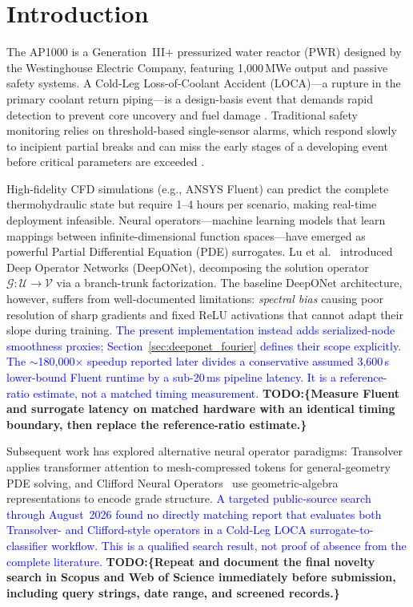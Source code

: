 \documentclass[journal]{IEEEtran}
\newcommand{\added}[1]{\textcolor{blue}{#1}}
\newcommand{\todo}[1]{\textcolor{green!50!black}{\textbf{TODO:\{#1\}}}}
\begin{document}
\section{Introduction}

The AP1000 is a Generation~III+ pressurized water reactor (PWR) designed by the Westinghouse Electric Company, featuring 1,000\,MWe output and passive safety systems. A Cold-Leg Loss-of-Coolant Accident (LOCA)---a rupture in the primary coolant return piping---is a design-basis event that demands rapid detection to prevent core uncovery and fuel damage \cite{wecdcd}. Traditional safety monitoring relies on threshold-based single-sensor alarms, which respond slowly to incipient partial breaks and can miss the early stages of a developing event before critical parameters are exceeded \cite{nrc_loca}.

High-fidelity CFD simulations (e.g., ANSYS Fluent) can predict the complete thermohydraulic state but require 1--4 hours per scenario, making real-time deployment infeasible. Neural operators---machine learning models that learn mappings between infinite-dimensional function spaces---have emerged as powerful Partial Differential Equation (PDE) surrogates. Lu et al.~\cite{lu2021deeponet} introduced Deep Operator Networks (DeepONet), decomposing the solution operator $\mathcal{G}: \mathcal{U} \to \mathcal{V}$ via a branch-trunk factorization. The baseline DeepONet architecture, however, suffers from well-documented limitations: \emph{spectral bias} causing poor resolution of sharp gradients \cite{rahaman2019spectral} and fixed ReLU activations that cannot adapt their slope during training.  \added{The present implementation instead adds serialized-node smoothness proxies; Section~\ref{sec:deeponet_fourier} defines their scope explicitly. The $\sim$180,000$\times$ speedup reported later divides a conservative assumed 3,600\,s lower-bound Fluent runtime by a sub-20\,ms pipeline latency. It is a reference-ratio estimate, not a matched timing measurement.} \todo{Measure Fluent and surrogate latency on matched hardware with an identical timing boundary, then replace the reference-ratio estimate.}

Subsequent work has explored alternative neural operator paradigms: Transolver~\cite{wu2024transolver} applies transformer attention to mesh-compressed tokens for general-geometry PDE solving, and Clifford Neural Operators~\cite{brandstetter2023clifford} use geometric-algebra representations to encode grade structure.  \added{A targeted public-source search through August~2026 found no directly matching report that evaluates both Transolver- and Clifford-style operators in a Cold-Leg LOCA surrogate-to-classifier workflow. This is a qualified search result, not proof of absence from the complete literature.} \todo{Repeat and document the final novelty search in Scopus and Web of Science immediately before submission, including query strings, date range, and screened records.}
\end{document}
